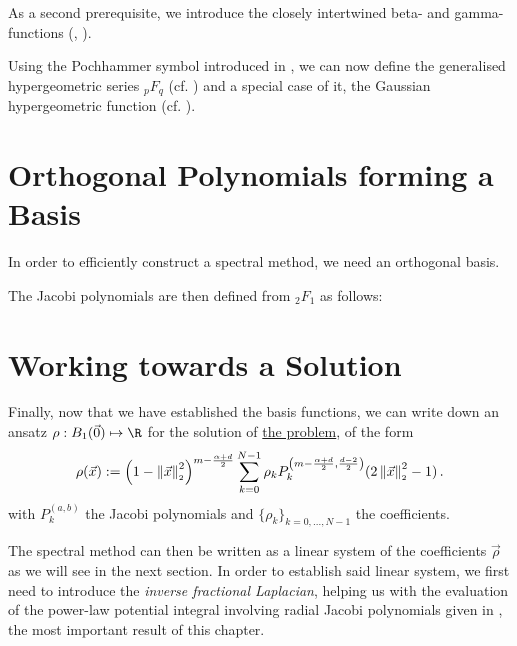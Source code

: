 As a second prerequisite, we introduce the closely intertwined beta- and gamma-functions (, ).



Using the Pochhammer symbol introduced in , we can now define the generalised hypergeometric series ${}_pF_q$ (cf. ) and a special case of it, the Gaussian hypergeometric function (cf. ).



\pagebreak
\section{Orthogonal Polynomials forming a Basis}
In order to efficiently construct a spectral method, we need an orthogonal basis.



The Jacobi polynomials are then defined from ${}_2F_1$ as follows:

% 
% 


\section{Working towards a Solution}
Finally, now that we have established the basis functions, we can write down an ansatz $\rho: B_1(\vec{0}) \mapsto \R$ for the solution of \hyperref[def:the-problem]{the problem}, of the form
\begin{equation}
  \rho(\vec{x}) := \left(1-\left\lVert\vec{x}\right\rVert_{\scriptscriptstyle 2}^{2}\right)^{m - \frac{\alpha + d}{2}} \sum_{k=0}^{N-1} \rho_k P_{k}^{\left(m - \frac{\alpha + d}{2},\frac{d-2}{2}\right)}(2 \left\lVert\vec{x}\right\rVert_{\scriptscriptstyle 2}^{2}-1)\,.
  \label{eq:ansatz}
\end{equation}
with $P_k^{(a, b)}$ the Jacobi polynomials and $\{\rho_k\}_{k=0, ..., N-1}$ the coefficients.

The spectral method can then be written as a linear system of the coefficients $\vec{\rho}$ as we will see in the next section.
In order to establish said linear system, we first need to introduce the \textit{inverse fractional Laplacian}, helping us with the evaluation of the power-law potential integral involving radial Jacobi polynomials given in , the most important result of this chapter.

